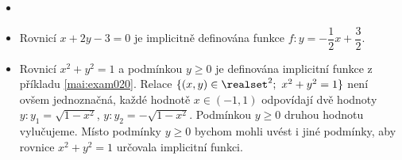 \begin{mdframed}[style=mdexam]
  \begin{example}\label{mai:exam022}
    \begin{itemize}
    \item[]
    \item  Rovnicí $x+2y-3=0$ je implicitně definována funkce  
          $f:y=-\dfrac{1}{2}x+\dfrac{3}{2}$.
    \item  Rovnicí $x^2+y^2=1$ a podmínkou $y\geq0$ je definována implicitní funkce z příkladu 
          \ref{mai:exam020}. Relace $\{(x,y)\in\realset^2;\ x^2+y^2=1\}$ není ovšem jednoznačná, 
          každé hodnotě $x\in(-1,1)$ odpovídají dvě hodnoty $y: y_1=\sqrt{1-x^2}$, $y: y_2 = 
          -\sqrt{1-x^2}$. Podmínkou $y\geq0$ druhou hodnotu vylučujeme. Místo podmínky $y\geq0$ 
          bychom mohli uvést i jiné podmínky, aby rovnice $x^2+y^2=1$ určovala implicitní funkci.   
    \end{itemize}
  \end{example}
\end{mdframed}